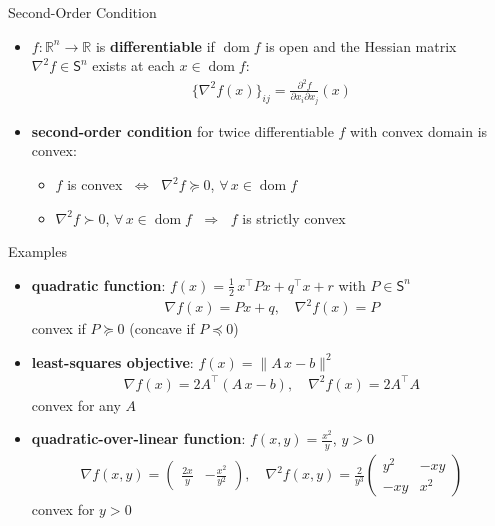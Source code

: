 \documentclass[10pt]{beamer}
\newcommand{\ds}{\displaystyle}
\newcommand{\ie}{\;\Longrightarrow\;}
\newcommand{\ifff}{\;\Longleftrightarrow\;}
\DeclareMathOperator*{\dom}{dom}
\theoremstyle{definition}
\begin{document}
\begin{frame}{Second-Order Condition}

\begin{itemize}
  \item $f:\mathbb{R}^n\to\mathbb{R}$ is {\bf differentiable} if $\dom f$ is open and the Hessian matrix $\nabla^2 f\in\mathsf{S}^n$ exists at each $x\in\dom f$: 
    \begin{align*}
      \big\{\nabla^2 f(x)\big\}_{ij} = \frac{\partial^2 f}{\partial x_i\partial x_j}(x)
    \end{align*}
  \item {\bf second-order condition} for twice differentiable $f$ with convex domain is convex: 
    \begin{itemize}
      \item $f$ is convex $\ifff$ $\nabla^2 f\succcurlyeq 0$, $\forall\,x\in\dom f$
      \item $\nabla^2 f\succ 0$, $\forall\,x\in\dom f$ $\ie$ $f$ is strictly convex
    \end{itemize}
\end{itemize}

\end{frame}

\begin{frame}{Examples}

\begin{itemize}
  \item {\bf quadratic function}: $\ds f(x) = \frac{1}{2}\,x^\top P x + q^\top x + r$ with $P\in\mathsf{S}^n$ 
    \begin{align*}
      \nabla f(x) = P x + q,\quad \nabla^2 f(x) = P
    \end{align*}
    convex if $P\succcurlyeq 0$ (concave if $P\preccurlyeq 0$)
  \item {\bf least-squares objective}: $\ds f(x) = \|A\,x - b\|^2$ 
    \begin{align*}
      \nabla f(x) = 2A^\top(A\,x - b),\quad \nabla^2 f(x) = 2 A^\top A 
    \end{align*}
    convex for any $A$
  \item {\bf quadratic-over-linear function}: $\ds f(x, y) = \frac{x^2}{y}$, $y > 0$ 
    \begin{align*}
      \nabla f(x, y) = \begin{pmatrix}\frac{2x}{y} & -\frac{x^2}{y^2}\end{pmatrix},\quad \nabla^2 f(x, y) = \frac{2}{y^3}\begin{pmatrix}y^2 & -xy \\ -xy & x^2 \end{pmatrix}
    \end{align*}
    convex for $y > 0$
\end{itemize}

\end{frame}
\end{document}
